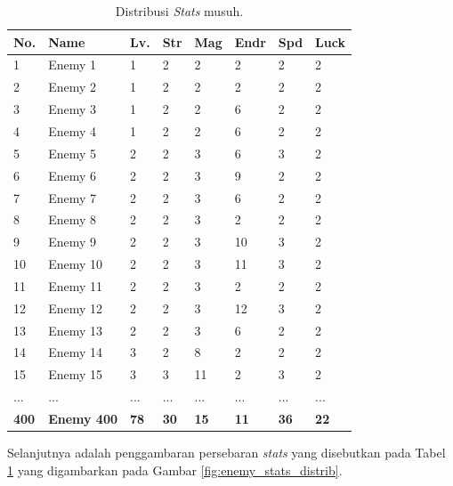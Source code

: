 \begin{longtable}{|l|l|l|l|l|l|l|l|}
	\caption{Distribusi \textit{Stats} musuh.}
	\label{tb:enemy_stats}\\
	\hline
	\textbf{No.} & \textbf{Name} & \textbf{Lv.} & \textbf{Str} & \textbf{Mag} & \textbf{Endr} & \textbf{Spd} & \textbf{Luck} \\ \hline
	1 & Enemy 1 & 1 & 2 & 2 & 2 & 2 & 2 \\ \hline
	2 & Enemy 2 & 1 & 2 & 2 & 2 & 2 & 2 \\ \hline
	3 & Enemy 3 & 1 & 2 & 2 & 6 & 2 & 2 \\ \hline
	4 & Enemy 4 & 1 & 2 & 2 & 6 & 2 & 2 \\ \hline
	5 & Enemy 5 & 2 & 2 & 3 & 6 & 3 & 2 \\ \hline
	6 & Enemy 6 & 2 & 2 & 3 & 9 & 2 & 2 \\ \hline
	7 & Enemy 7 & 2 & 2 & 3 & 6 & 2 & 2 \\ \hline
	8 & Enemy 8 & 2 & 2 & 3 & 2 & 2 & 2 \\ \hline
	9 & Enemy 9 & 2 & 2 & 3 & 10 & 3 & 2 \\ \hline
	10 & Enemy 10 & 2 & 2 & 3 & 11 & 3 & 2 \\ \hline
	11 & Enemy 11 & 2 & 2 & 3 & 2 & 2 & 2 \\ \hline
	12 & Enemy 12 & 2 & 2 & 3 & 12 & 3 & 2 \\ \hline
	13 & Enemy 13 & 2 & 2 & 3 & 6 & 2 & 2 \\ \hline
	14 & Enemy 14 & 3 & 2 & 8 & 2 & 2 & 2 \\ \hline
	15 & Enemy 15 & 3 & 3 & 11 & 2 & 3 & 2 \\ \hline
	... & ... & ... & ... & ... & ... & ... & ... \\ \hline
	\textbf{400} & \textbf{Enemy 400} & \textbf{78} & \textbf{30} & \textbf{15} & \textbf{11} & \textbf{36} & \textbf{22} \\ \hline
\end{longtable}

Selanjutnya adalah penggambaran persebaran \textit{stats} yang disebutkan pada Tabel \ref{tb:enemy_stats} yang digambarkan pada Gambar \ref{fig:enemy_stats_distrib}.


